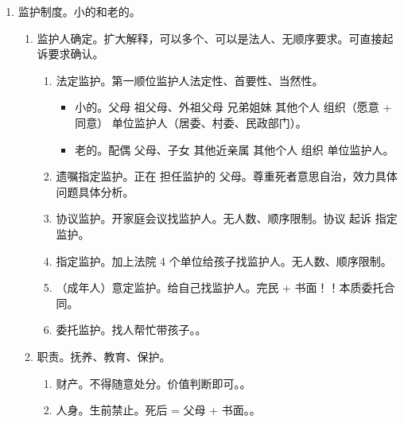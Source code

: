 \begin{enumerate}
\begin{enumerate}
\begin{enumerate}
                  \item 限制民事行为能力 。不相适应的单/双方民事法律行为/纯获法律上的利益 \yjt 无效/待定/有效。
                  \item 完全民事行为能力   + 劳动收入（扩大解释，）。
                  \item 无、限成年人。精神、健康状态。
                \end{enumerate}
          \item 监护制度。小的和老的。
                \begin{enumerate}
                  \item 监护人确定。扩大解释，可以多个、可以是法人、无顺序要求。可直接起诉要求确认。
                        \begin{enumerate}
                          \item 法定监护。第一顺位监护人法定性、首要性、当然性。
                                \begin{itemize}
                                  \item 小的。父母 \dy 祖父母、外祖父母 \dy 兄弟姐妹 \dy 其他个人 \hz 组织（愿意 + 同意） \dy 单位监护人（居委、村委、民政部门）。
                                  \item 老的。配偶 \dy 父母、子女 \dy 其他近亲属 \dy 其他个人 \hz 组织 \dy 单位监护人。
                                \end{itemize}
                          \item 遗嘱指定监护。\yi 正在 \er 担任监护的 \san 父母。尊重死者意思自治，效力具体问题具体分析。
                          \item 协议监护。开家庭会议找监护人。无人数、顺序限制。协议 \yjt 起诉 \yjt 指定监护。
                          \item 指定监护。加上法院 4 个单位给孩子找监护人。无人数、顺序限制。
                          \item （成年人）意定监护。给自己找监护人。完民 + 书面！！\xjt 本质委托合同。
                          \item 委托监护。找人帮忙带孩子。。
                        \end{enumerate}
                  \item 职责。抚养、教育、保护。
                        \begin{enumerate}
                          \item 财产。不得随意处分。价值判断即可。。
                          \item 人身。\yi 生前禁止。\er 死后 = 父母 + 书面。。

\end{enumerate}
\end{enumerate}
\end{enumerate}
\end{enumerate}
